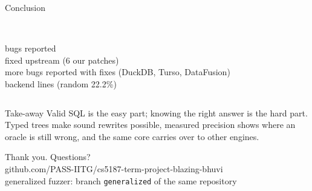 \documentclass[aspectratio=169,10pt]{beamer}
\begin{document}
\begin{frame}{Conclusion}
\begin{columns}[T]
\\\small \pg bugs reported
\\\small fixed upstream (6 our patches)
\\\small more bugs reported with fixes (DuckDB, Turso, DataFusion)
\\\small backend lines (random 22.2\%)
\end{columns}
\bigskip
\begin{block}{Take-away}
Valid SQL is the easy part; knowing the right answer is the hard part. Typed trees make sound
rewrites possible, measured precision shows where an oracle is still wrong, and the same core
carries over to other engines.
\end{block}
\end{frame}

\begin{frame}[standout]
Thank you. Questions?\\[6pt]
\normalsize github.com/PASS-IITG/cs5187-term-project-blazing-bhuvi\\
\small generalized fuzzer: branch \texttt{generalized} of the same repository
\end{frame}
\end{document}
